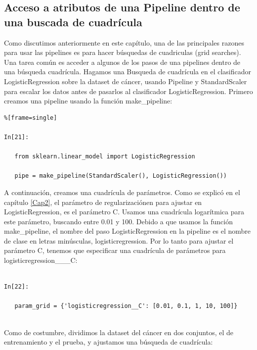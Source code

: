 	
	
	\subsection{Acceso a atributos de una Pipeline dentro de una  buscada de cuadrícula}
	
	
	
	Como discutimos anteriormente en este capítulo, una de las principales razones para usar las
	pipelines  es para hacer búsquedas de cuadriculas (grid searches). Una tarea común es acceder 
	 a algunos de los pasos   de una pipelines dentro de una búsqueda  cuadrícula.
	Hagamos una Busqueda de cuadrícula en el clasificador   {\ttfamily LogisticRegression} sobre la dataset de cáncer, usando {\ttfamily Pipeline} y {\ttfamily StandardScaler} para 
	escalar los datos antes de pasarlos al clasificador  {\ttfamily LogisticRegression}.  Primero creamos una pipeline usando la función {\ttfamily make\_pipeline}: 
	
	
	\begin{lstlisting}%[frame=single]
	
In[21]:
	
   from sklearn.linear_model import LogisticRegression
   
   pipe = make_pipeline(StandardScaler(), LogisticRegression())   
   \end{lstlisting} 
	
	
	A continuación, creamos una cuadrícula de parámetros. Como se explicó en el capítulo \ref{Cap2}, 
	\: el parámetro de regularizaciónen  para ajustar en  {\ttfamily LogisticRegression}, es el parámetro C. Usamos una cuadrícula logarítmica para este parámetro, buscando entre 0.01 y 100. Debido a que usamos la función {\ttfamily make\_pipeline}, el nombre del paso {\ttfamily LogisticRegression } en la pipeline  es el nombre de clase en letras minúsculas, {\ttfamily logisticregression}.   Por lo tanto para ajustar el parámetro C, tenemos que especificar una cuadrícula de parámetros para {\ttfamily logisticregression{\scriptsize\_\!\_\!\_}C}:
	
	\begin{lstlisting}
	
In[22]:
	
   param_grid = {'logisticregression__C': [0.01, 0.1, 1, 10, 100]}
   
   \end{lstlisting}
   
   
   Como de costumbre, dividimos la dataset del cáncer en dos conjuntos, el de entrenamiento y el prueba, y ajustamos una búsqueda de cuadrícula:   
   
